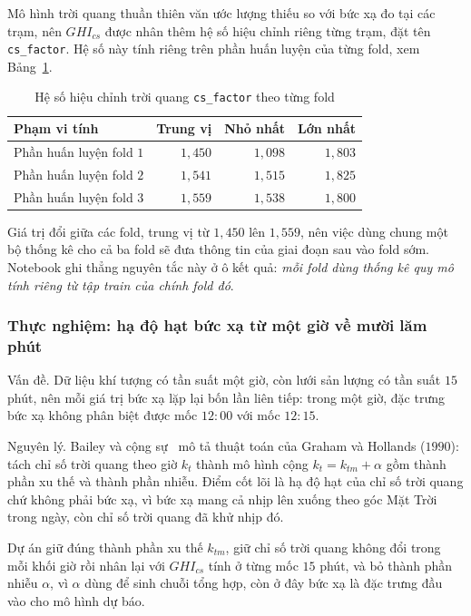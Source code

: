 \documentclass[12pt, a4paper]{report}
\begin{document}
Mô hình trời quang thuần thiên văn ước lượng thiếu so với bức xạ đo tại các trạm, nên
$GHI_{cs}$ được nhân thêm hệ số hiệu chỉnh riêng từng trạm, đặt tên \texttt{cs\_factor}. Hệ số
này tính riêng trên phần huấn luyện của từng fold, xem Bảng~\ref{tab:cs_factor}.

\begin{table}[htbp]
\centering
\caption{Hệ số hiệu chỉnh trời quang \texttt{cs\_factor} theo từng fold}
\label{tab:cs_factor}
\small
\begin{tabular}{l r r r}
\toprule
\textbf{Phạm vi tính} & \textbf{Trung vị} & \textbf{Nhỏ nhất} & \textbf{Lớn nhất} \\
\midrule
Phần huấn luyện fold $1$ & $1{,}450$ & $1{,}098$ & $1{,}803$ \\
Phần huấn luyện fold $2$ & $1{,}541$ & $1{,}515$ & $1{,}825$ \\
Phần huấn luyện fold $3$ & $1{,}559$ & $1{,}538$ & $1{,}800$ \\
\bottomrule
\end{tabular}


\end{table}

Giá trị đổi giữa các fold, trung vị từ $1{,}450$ lên $1{,}559$, nên việc dùng chung
một bộ thống kê cho cả ba fold sẽ đưa thông tin của giai đoạn sau vào fold sớm. Notebook ghi
thẳng nguyên tắc này ở ô kết quả: \textit{mỗi fold dùng thống kê quy mô tính riêng từ tập
train của chính fold đó}.

\subsubsection{Thực nghiệm: hạ độ hạt bức xạ từ một giờ về mười lăm phút}

Vấn đề. Dữ liệu khí tượng có tần suất một giờ, còn lưới sản lượng có tần suất $15$
phút, nên mỗi giá trị bức xạ lặp lại bốn lần liên tiếp: trong một giờ, đặc trưng bức xạ không
phân biệt được mốc $12{:}00$ với mốc $12{:}15$.

Nguyên lý. Bailey và cộng sự~\cite{bailey2024} mô tả thuật toán của Graham và
Hollands ($1990$): tách chỉ số trời quang theo giờ $k_t$ thành mô hình cộng
$k_t = k_{tm} + \alpha$ gồm thành phần xu thế và thành phần nhiễu. Điểm cốt lõi là hạ độ hạt
của chỉ số trời quang chứ không phải bức xạ, vì bức xạ mang cả nhịp lên xuống theo góc Mặt
Trời trong ngày, còn chỉ số trời quang đã khử nhịp đó.

Dự án giữ đúng thành phần xu thế $k_{tm}$, giữ chỉ số trời quang không đổi trong mỗi khối
giờ rồi nhân lại với $GHI_{cs}$ tính ở từng mốc $15$ phút, và bỏ thành phần nhiễu $\alpha$,
vì $\alpha$ dùng để sinh chuỗi tổng hợp, còn ở đây bức xạ là đặc trưng đầu vào cho mô hình
dự báo.
\end{document}
